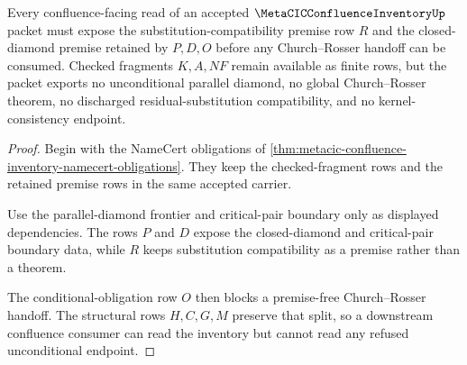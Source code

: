 \begin{theorem}\label{thm:metacic-confluence-inventory-conditional-boundary}
Every confluence-facing read of an accepted $\MetaCICConfluenceInventoryUp$ packet must expose the substitution-compatibility premise row $R$ and the closed-diamond premise retained by $P,D,O$ before any Church--Rosser handoff can be consumed. Checked fragments $K,A,NF$ remain available as finite rows, but the packet exports no unconditional parallel diamond, no global Church--Rosser theorem, no discharged residual-substitution compatibility, and no kernel-consistency endpoint.
\end{theorem}
\begin{proof}
Begin with the NameCert obligations of \autoref{thm:metacic-confluence-inventory-namecert-obligations}. They keep the checked-fragment rows and the retained premise rows in the same accepted carrier.

Use the parallel-diamond frontier and critical-pair boundary only as displayed dependencies. The rows $P$ and $D$ expose the closed-diamond and critical-pair boundary data, while $R$ keeps substitution compatibility as a premise rather than a theorem.

The conditional-obligation row $O$ then blocks a premise-free Church--Rosser handoff. The structural rows $H,C,G,M$ preserve that split, so a downstream confluence consumer can read the inventory but cannot read any refused unconditional endpoint.
\end{proof}





